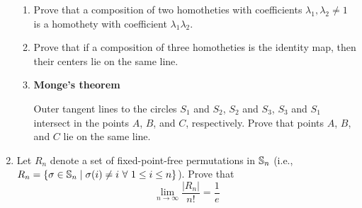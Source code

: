\documentclass[../main.tex]{subfiles}
\begin{document}
\begin{enumerate}
\begin{enumerate}
        \item Prove that a composition of two homotheties with coefficients $\lambda_1,\lambda_2\neq 1$ is a homothety with coefficient $\lambda_1\lambda_2$.
        \item Prove that if a composition of three homotheties is the identity map, then their centers lie on the same line.
        \item \textbf{Monge's theorem}\par
        Outer tangent lines to the circles $S_1$ and $S_2$, $S_2$ and $S_3$, $S_3$ and $S_1$ intersect in the points $A$, $B$, and $C$, respectively. Prove that points $A$, $B$, and $C$ lie on the same line.
    \end{enumerate} 
    \item Let $R_n$ denote a set of fixed-point-free permutations in $\mathbb{S}_n$ (i.e., $R_n=\{\sigma\in\Ss_n\mid\sigma(i)\neq i\ \forall\ 1\leq i\leq n\}$). Prove that
    \begin{equation*}
        \lim_{n\to\infty}\frac{|R_n|}{n!} = \frac{1}{e}
    \end{equation*}
\end{enumerate}
\end{document}
